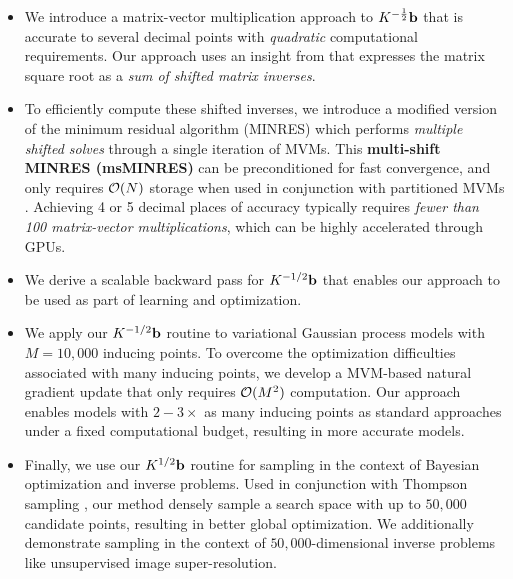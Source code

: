 \begin{itemize}
  \item We introduce a matrix-vector multiplication approach to $K^{-\frac 1 2} \mathbf{b}$ that is accurate to several decimal points with \emph{quadratic} computational requirements.
    Our approach uses an insight from \citet{hale2008computing} that expresses the matrix square root as a \emph{sum of shifted matrix inverses}.

  \item To efficiently compute these shifted inverses, we introduce a modified version of the minimum residual algorithm (MINRES) \cite{paige1975solution} which performs \emph{multiple shifted solves} through a single iteration of MVMs.
    This {\bf multi-shift MINRES (msMINRES)} can be preconditioned for fast convergence, and only requires $\bigo{N}$ storage when used in conjunction with partitioned MVMs \cite{wang2019exact,charlier2020kernel}.
    Achieving 4 or 5 decimal places of accuracy typically requires \emph{fewer than 100 matrix-vector multiplications}, which can be highly accelerated through GPUs.

  \item We derive a scalable backward pass for $K^{-1/2} \mathbf{b}$ that enables our approach to be used as part of learning and optimization.

  \item We apply our $K^{-1/2} \mathbf{b}$ routine to variational Gaussian process models with $M = 10,\!000$ inducing points.
    To overcome the optimization difficulties associated with many inducing points, we develop a MVM-based natural gradient update that only requires $\bigo{M^2}$ computation.
    Our approach enables models with $2-3\times$ as many inducing points as standard approaches under a fixed computational budget, resulting in more accurate models.

  \item Finally, we use our $K^{1/2} \mathbf{b}$ routine for sampling in the context of Bayesian optimization and inverse problems.
    Used in conjunction with Thompson sampling \cite{thompson1933likelihood}, our method densely sample a search space with up to $50,\!000$ candidate points, resulting in better global optimization.
		We additionally demonstrate sampling in the context of $50,\!000$-dimensional inverse problems like unsupervised image super-resolution.
\end{itemize}
